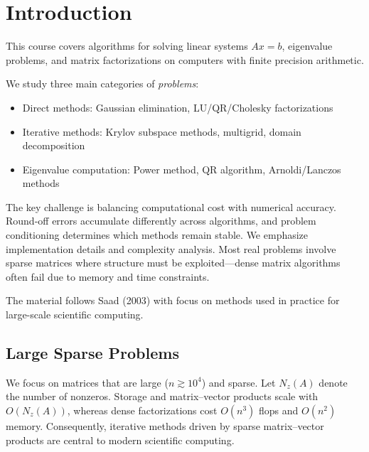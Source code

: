 \documentclass[../../main.tex]{subfiles}
\begin{document}
\chapter{Introduction}\label{ch:introduction}
This course covers algorithms for solving linear systems $Ax = b$, eigenvalue problems, and matrix factorizations on computers with finite precision arithmetic.

We study three main categories of \emph{problems}:
\begin{itemize}
    \item Direct methods: Gaussian elimination, LU/QR/Cholesky factorizations
    \item Iterative methods: Krylov subspace methods, multigrid, domain decomposition
    \item Eigenvalue computation: Power method, QR algorithm, Arnoldi/Lanczos methods
\end{itemize}

The key challenge is balancing computational cost with numerical accuracy. Round-off errors accumulate differently across algorithms, and problem conditioning determines which methods remain stable.
We emphasize implementation details and complexity analysis. Most real problems involve sparse matrices where structure must be exploited—dense matrix algorithms often fail due to memory and time constraints.

The material follows Saad (2003) with focus on methods used in practice for large-scale scientific computing.

\section{Large Sparse Problems}
We focus on matrices that are large ($n\gtrsim 10^4$) and sparse. Let $N_z(A)$ denote the number of nonzeros. Storage and matrix--vector products scale with $O(N_z(A))$, whereas dense factorizations cost $O(n^3)$ flops and $O(n^2)$ memory. Consequently, iterative methods driven by sparse matrix--vector products are central to modern scientific computing.
\end{document}

